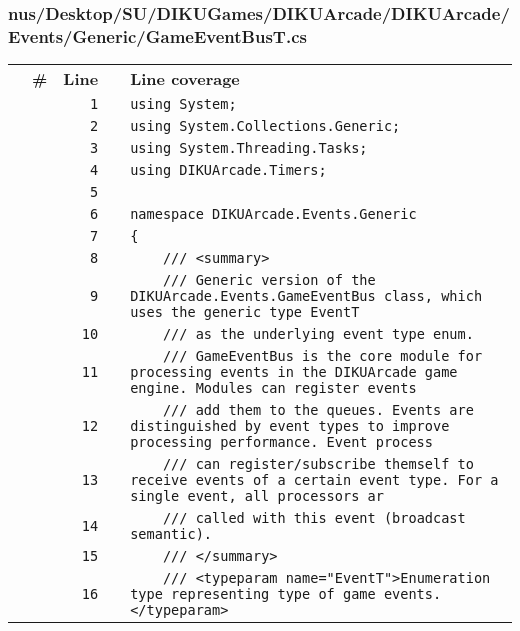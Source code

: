 \documentclass[a4paper,landscape,10pt]{article}
\begin{document}
\subsubsection{nus/Desktop/SU/DIKUGames/DIKUArcade/DIKUArcade/Events/Generic/GameEventBusT.cs}
\begin{longtable}[l]{lrrll}
\textbf{} & \textbf{\#} & \textbf{Line} & \textbf{} & \textbf{Line coverage}\\
\cellcolor{gray} &  & \verb~1~ & & \verb~using System;~\\
\cellcolor{gray} &  & \verb~2~ & & \verb~using System.Collections.Generic;~\\
\cellcolor{gray} &  & \verb~3~ & & \verb~using System.Threading.Tasks;~\\
\cellcolor{gray} &  & \verb~4~ & & \verb~using DIKUArcade.Timers;~\\
\cellcolor{gray} &  & \verb~5~ & & \verb~~\\
\cellcolor{gray} &  & \verb~6~ & & \verb~namespace DIKUArcade.Events.Generic~\\
\cellcolor{gray} &  & \verb~7~ & & \verb~{~\\
\cellcolor{gray} &  & \verb~8~ & & \verb~    /// <summary>~\\
\cellcolor{gray} &  & \verb~9~ & & \verb~    /// Generic version of the DIKUArcade.Events.GameEventBus class, which uses the generic type EventT~\\
\cellcolor{gray} &  & \verb~10~ & & \verb~    /// as the underlying event type enum.~\\
\cellcolor{gray} &  & \verb~11~ & & \verb~    /// GameEventBus is the core module for processing events in the DIKUArcade game engine. Modules can register events~\\
\cellcolor{gray} &  & \verb~12~ & & \verb~    /// add them to the queues. Events are distinguished by event types to improve processing performance. Event process~\\
\cellcolor{gray} &  & \verb~13~ & & \verb~    /// can register/subscribe themself to receive events of a certain event type. For a single event, all processors ar~\\
\cellcolor{gray} &  & \verb~14~ & & \verb~    /// called with this event (broadcast semantic).~\\
\cellcolor{gray} &  & \verb~15~ & & \verb~    /// </summary>~\\
\cellcolor{gray} &  & \verb~16~ & & \verb~    /// <typeparam name="EventT">Enumeration type representing type of game events.</typeparam>~\\

\end{longtable}
\end{document}
